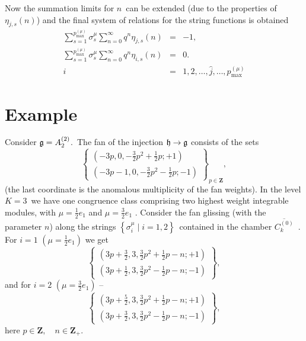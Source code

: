 \documentclass{article}
\begin{document}
Now the summation limits for $n$\ can be extended (due to the properties of $%
\eta _{j,s}\left( n\right) $) and the final system of relations for the
string functions is obtained 
\begin{eqnarray*}
\sum_{s=1}^{p_{\max }^{\left( \mu \right) }}\sigma _{s}^{\mu
}\sum_{n=0}^{\infty }q^{n}\eta _{j,s}\left( n\right) &=&-1, \\
\sum_{s=1}^{p_{\max }^{\left( \mu \right) }}\sigma _{s}^{\mu
}\sum_{n=0}^{\infty }q^{n}\eta _{i,s}\left( n\right) &=&0. \\
i &=&1,2,\ldots ,\widehat{j},\ldots ,p_{\max }^{\left( \mu \right) }
\end{eqnarray*}

\section{Example}

Consider $\frak{g}=A_{2}^{\left( 2\right) }$.\ The fan of the injection $%
\frak{h}\rightarrow \frak{g}$ consists of the sets 
\begin{equation*}
\left\{ 
\begin{array}{c}
\left( -3p,0,-\frac{3}{2}p^{2}+\frac{1}{2}p;+1\right) \\ 
\left( -3p-1,0,-\frac{3}{2}p^{2}-\frac{1}{2}p;-1\right)
\end{array}
\right\} _{p\in \mathbf{Z}},
\end{equation*}
(the last coordinate is the anomalous multiplicity of the fan weights). In
the level $K=3$\ we have one congruence class comprising two highest weight
integrable modules, with $\mu =\frac{1}{2}e_{1}$ and $\mu =\frac{3}{2}e_{1}$%
. Consider the fan glissing (with the parameter $n$) along the strings $%
\left\{ \sigma _{i}^{\mu }\mid i=1,2\right\} $\ contained in the chamber $%
\overline{C_{k}^{\left( 0\right) }}$\ . For $i=1$ $\left( \mu =\frac{1}{2}%
e_{1}\right) $ we get 
\begin{equation*}
\left\{ 
\begin{array}{c}
\left( 3p+\frac{3}{2},3,\frac{3}{2}p^{2}+\frac{1}{2}p-n;+1\right) \\ 
\left( 3p+\frac{1}{2},3,\frac{3}{2}p^{2}-\frac{1}{2}p-n;-1\right)
\end{array}
\right\} ,
\end{equation*}
and for $i=2$ $\left( \mu =\frac{3}{2}e_{1}\right) $ -- 
\begin{equation*}
\left\{ 
\begin{array}{c}
\left( 3p+\frac{5}{2},3,\frac{3}{2}p^{2}+\frac{1}{2}p-n;+1\right) \\ 
\left( 3p+\frac{3}{2},3,\frac{3}{2}p^{2}-\frac{1}{2}p-n;-1\right)
\end{array}
\right\} ,
\end{equation*}
here $p\in \mathbf{Z,\quad }n\in \mathbf{Z}_{+}\mathbf{.}$\ 
\end{document}
